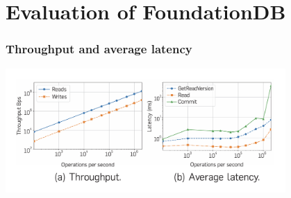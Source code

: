 \section{Evaluation of FoundationDB}
\begin{frame}
    \frametitle{Throughput and average latency}
    \begin{center}
        \includegraphics[width=0.8\textwidth]{img/4-Evaluation/Throughput-Average latency.png}
    \end{center}
\end{frame}
